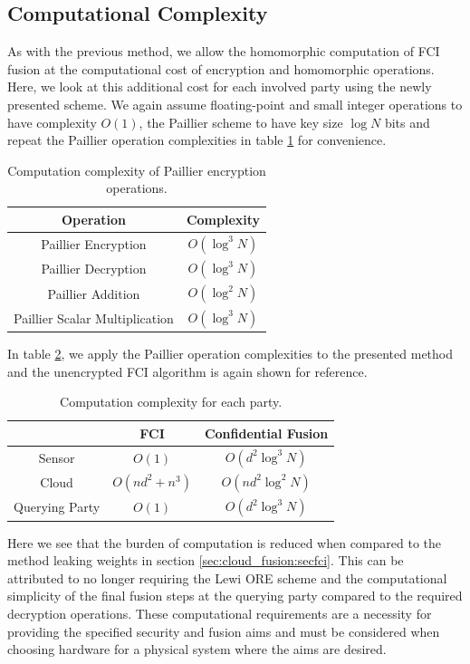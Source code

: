 \subsection{Computational Complexity}\label{subsec:cloud_fusion:secfci2_comp_complexity}
As with the previous method, we allow the homomorphic computation of FCI fusion at the computational cost of encryption and homomorphic operations. Here, we look at this additional cost for each involved party using the newly presented scheme. We again assume floating-point and small integer operations to have complexity $O(1)$, the Paillier scheme to have key size $\log{N}$ bits and repeat the Paillier operation complexities in table \ref{tab:cloud_fusion:secfci2_op_complexity} for convenience. 
\begin{table}[htbp]
    \centering
    \caption{Computation complexity of Paillier encryption operations.}
    \label{tab:cloud_fusion:secfci2_op_complexity}
    \begin{tabular}{|c|c|}
        \hline
        \textbf{Operation} & \textbf{Complexity} \\ 
        \hline
        Paillier Encryption & $O(\log^3{N})$ \\ 
        Paillier Decryption & $O(\log^3{N})$ \\ 
        Paillier Addition & $O(\log^2{N})$ \\ 
        Paillier Scalar Multiplication & $O(\log^3{N})$ \\ 
        \hline
    \end{tabular}
\end{table}
In table \ref{tab:cloud_fusion:secfci2_complexity}, we apply the Paillier operation complexities to the presented method and the unencrypted FCI algorithm is again shown for reference.
\begin{table}[tb]
    \centering
    \caption{Computation complexity for each party.}
    \label{tab:cloud_fusion:secfci2_complexity}
    \begin{tabular}{|c|c|c|}
       \hline
        & \textbf{FCI} & \textbf{Confidential Fusion} \\ 
       \hline
       Sensor & $O(1)$ & $O\left(d^2\log^3{N}\right)$ \\ 
       Cloud & $O\left(nd^2 + n^3\right)$ & $O\left(nd^2\log^2{N}\right)$ \\ 
       Querying Party & $O(1)$ & $O\left(d^2\log^3{N}\right)$ \\ 
       \hline
    \end{tabular}
 \end{table}
Here we see that the burden of computation is reduced when compared to the method leaking weights in section \ref{sec:cloud_fusion:secfci}. This can be attributed to no longer requiring the Lewi ORE scheme and the computational simplicity of the final fusion steps at the querying party compared to the required decryption operations. These computational requirements are a necessity for providing the specified security and fusion aims and must be considered when choosing hardware for a physical system where the aims are desired.


